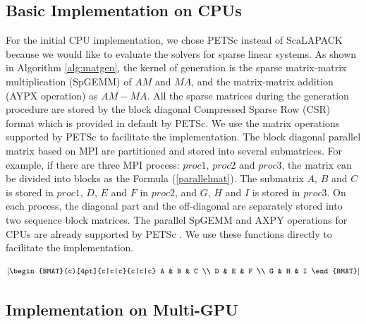 \subsection{Basic Implementation on CPUs}

For the initial CPU implementation, we chose PETSc instead of ScaLAPACK because we would like to evaluate the solvers for sparse linear systems. As shown in Algorithm \ref{alg:matgen}, the kernel of generation is the sparse matrix-matrix multiplication (SpGEMM) of $AM$ and $MA$, and the matrix-matrix addition (AYPX operation) as $AM-MA$. All the sparse matrices during the generation procedure are stored by the block diagonal Compressed Sparse Row (CSR) format which is provided in default by PETSc. We use the matrix operations supported by PETSc to facilitate the implementation. The block diagonal parallel matrix based on MPI are partitioned and stored into several submatrices. For example, if there are three MPI process: $proc1$, $proc2$ and $proc3$, the matrix can be divided into blocks as the Formula (\ref{parallelmat}). The submatrix $A$, $B$ and $C$ is stored in $proc1$,  $D$, $E$ and $F$ in $proc2$, and $G$, $H$ and $I$ is stored in $proc3$. On each process, the diagonal part and the off-diagonal are separately stored into two sequence block matrices. The parallel SpGEMM and AXPY operations for CPUs are already supported by PETSc \cite{balay2016petsc}. We use these functions directly to facilitate the implementation.


\begin{equation}
\label{parallelmat}
\left[
\begin{BMAT}(c)[4pt]{c|c|c}{c|c|c}
A  & B & C  \\
D & E & F  \\
G & H & I 
\end{BMAT}
\right]
\end{equation}


\subsection{Implementation on Multi-GPU}

